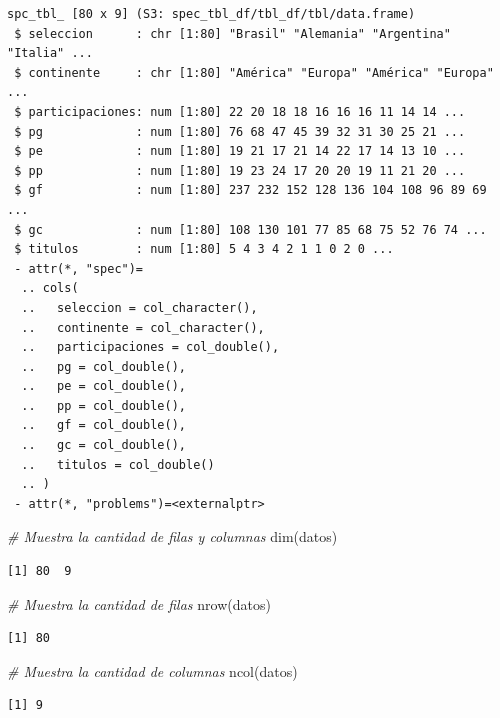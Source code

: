 \documentclass[
]{book}
\newenvironment{Shaded}{\begin{snugshade}}{\end{snugshade}}
\newcommand{\CommentTok}[1]{\textcolor[rgb]{0.56,0.35,0.01}{\textit{#1}}}
\newcommand{\FunctionTok}[1]{\textcolor[rgb]{0.00,0.00,0.00}{#1}}
\newcommand{\NormalTok}[1]{#1}
\begin{document}
\begin{verbatim}
spc_tbl_ [80 x 9] (S3: spec_tbl_df/tbl_df/tbl/data.frame)
 $ seleccion      : chr [1:80] "Brasil" "Alemania" "Argentina" "Italia" ...
 $ continente     : chr [1:80] "América" "Europa" "América" "Europa" ...
 $ participaciones: num [1:80] 22 20 18 18 16 16 16 11 14 14 ...
 $ pg             : num [1:80] 76 68 47 45 39 32 31 30 25 21 ...
 $ pe             : num [1:80] 19 21 17 21 14 22 17 14 13 10 ...
 $ pp             : num [1:80] 19 23 24 17 20 20 19 11 21 20 ...
 $ gf             : num [1:80] 237 232 152 128 136 104 108 96 89 69 ...
 $ gc             : num [1:80] 108 130 101 77 85 68 75 52 76 74 ...
 $ titulos        : num [1:80] 5 4 3 4 2 1 1 0 2 0 ...
 - attr(*, "spec")=
  .. cols(
  ..   seleccion = col_character(),
  ..   continente = col_character(),
  ..   participaciones = col_double(),
  ..   pg = col_double(),
  ..   pe = col_double(),
  ..   pp = col_double(),
  ..   gf = col_double(),
  ..   gc = col_double(),
  ..   titulos = col_double()
  .. )
 - attr(*, "problems")=<externalptr> 
\end{verbatim}

\begin{Shaded}
\begin{Highlighting}[]
\CommentTok{\# Muestra la cantidad de filas y columnas}
\FunctionTok{dim}\NormalTok{(datos)}
\end{Highlighting}
\end{Shaded}

\begin{verbatim}
[1] 80  9
\end{verbatim}

\begin{Shaded}
\begin{Highlighting}[]
\CommentTok{\# Muestra la cantidad de filas}
\FunctionTok{nrow}\NormalTok{(datos)}
\end{Highlighting}
\end{Shaded}

\begin{verbatim}
[1] 80
\end{verbatim}

\begin{Shaded}
\begin{Highlighting}[]
\CommentTok{\# Muestra la cantidad de columnas}
\FunctionTok{ncol}\NormalTok{(datos)}
\end{Highlighting}
\end{Shaded}

\begin{verbatim}
[1] 9
\end{verbatim}
\end{document}
